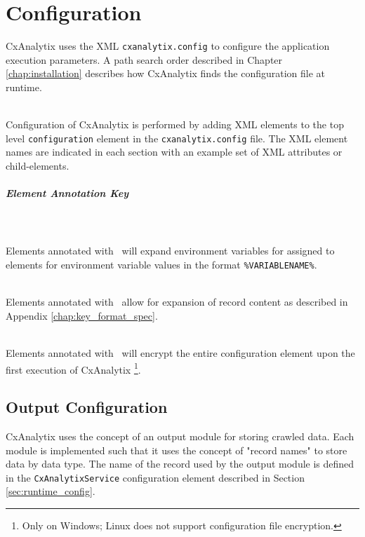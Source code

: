 \chapter{Configuration}\label{chap:configuration}

\newcommand{\expandsenv}{\faCogs\ }
\newcommand{\encrypts}{\faLock\ }
\newcommand{\contentvariables}{\faEye\ }




CxAnalytix uses the XML \texttt{cxanalytix.config} to configure the application execution parameters.  A path search order described in Chapter \ref{chap:installation}
describes how CxAnalytix finds the configuration file at runtime.

\noindent\\Configuration of CxAnalytix is performed by adding XML elements to the top level \texttt{configuration} element in the
\texttt{cxanalytix.config} file.  The XML element names are indicated in each section with an example set of XML attributes or child-elements.

\paragraph{Element Annotation Key}

\noindent\\\\Elements annotated with \expandsenv will expand environment variables for assigned to elements for environment variable values in the
format \texttt{\%VARIABLENAME\%}.  

\noindent\\Elements annotated with \contentvariables allow for expansion of record content as described in Appendix \ref{chap:key_format_spec}.  

\noindent\\Elements annotated with \encrypts will encrypt the entire configuration element upon the first execution of CxAnalytix
\footnote{Only on Windows; Linux does not support configuration file encryption.}.  






\section{Output Configuration}

CxAnalytix uses the concept of an output module for storing crawled data.  Each module is implemented such that it uses the concept of "record names" 
to store data by data type.  The name of the record used by the output module is defined in the \texttt{CxAnalytixService} configuration element described
in Section \ref{sec:runtime_config}.

